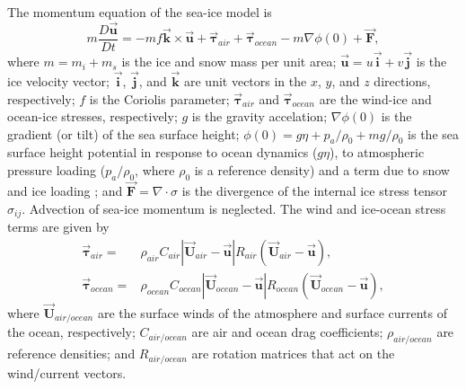 \newcommand{\vek}[1]{\ensuremath{\vec{\mathbf{#1}}}}
\newcommand{\vtau}{\vek{\mathbf{\tau}}}
The momentum equation of the sea-ice model is
\begin{equation}
  \label{eq:momseaice}
  m \frac{D\vek{u}}{Dt} = -mf\vek{k}\times\vek{u} + \vtau_{air} +
  \vtau_{ocean} - m \nabla{\phi(0)} + \vek{F},
\end{equation}
where $m=m_{i}+m_{s}$ is the ice and snow mass per unit area;
$\vek{u}=u\vek{i}+v\vek{j}$ is the ice velocity vector;
$\vek{i}$, $\vek{j}$, and $\vek{k}$ are unit vectors in the $x$, $y$, and $z$
directions, respectively;
$f$ is the Coriolis parameter;
$\vtau_{air}$ and $\vtau_{ocean}$ are the wind-ice and ocean-ice stresses,
respectively;
$g$ is the gravity accelation;
$\nabla\phi(0)$ is the gradient (or tilt) of the sea surface height;
$\phi(0) = g\eta + p_{a}/\rho_{0} + mg/\rho_{0}$ is the sea surface
height potential in response to ocean dynamics ($g\eta$), to
atmospheric pressure loading ($p_{a}/\rho_{0}$, where $\rho_{0}$ is a
reference density) and a term due to snow and ice loading \citep{cam08};
and $\vek{F}=\nabla\cdot\sigma$ is the divergence of the internal ice
stress tensor $\sigma_{ij}$. %
Advection of sea-ice momentum is neglected. The wind and ice-ocean stress
terms are given by
\begin{align*}
  \vtau_{air}   = & \rho_{air}  C_{air}   |\vek{U}_{air}  -\vek{u}|
                   R_{air}  (\vek{U}_{air}  -\vek{u}), \\ 
  \vtau_{ocean} = & \rho_{ocean}C_{ocean} |\vek{U}_{ocean}-\vek{u}| 
                   R_{ocean}(\vek{U}_{ocean}-\vek{u}),
\end{align*}
where $\vek{U}_{air/ocean}$ are the surface winds of the atmosphere
and surface currents of the ocean, respectively; $C_{air/ocean}$ are
air and ocean drag coefficients; $\rho_{air/ocean}$ are reference
densities; and $R_{air/ocean}$ are rotation matrices that act on the
wind/current vectors.

